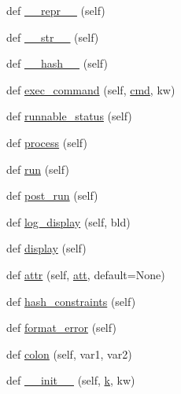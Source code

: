 \begin{DoxyCompactItemize}
\item 
def \hyperlink{classwaflib_1_1_task_1_1_task_base_a004a67fbb5d7e36d1a6ba48390e0d5f7}{\+\_\+\+\_\+repr\+\_\+\+\_\+} (self)
\item 
def \hyperlink{classwaflib_1_1_task_1_1_task_base_a07123f80c95b1d17a699064cd10d8885}{\+\_\+\+\_\+str\+\_\+\+\_\+} (self)
\item 
def \hyperlink{classwaflib_1_1_task_1_1_task_base_a5e02f89716bcd37b2490adc0861c4bdd}{\+\_\+\+\_\+hash\+\_\+\+\_\+} (self)
\item 
def \hyperlink{classwaflib_1_1_task_1_1_task_base_a6326ff82d67a2b629c8d78b95cb8fec6}{exec\+\_\+command} (self, \hyperlink{sndfile__play_8m_adfc5ba7e22f5e4a6221c12a70503bef3}{cmd}, kw)
\item 
def \hyperlink{classwaflib_1_1_task_1_1_task_base_a10c4597d9085bd1680f9b3eb28e23899}{runnable\+\_\+status} (self)
\item 
def \hyperlink{classwaflib_1_1_task_1_1_task_base_ae5e951a187c8d09c31960bbcf76fad25}{process} (self)
\item 
def \hyperlink{classwaflib_1_1_task_1_1_task_base_ae549bc1a80fd94cc94fd1e764c76895c}{run} (self)
\item 
def \hyperlink{classwaflib_1_1_task_1_1_task_base_a21b09d3f18df76e1d8b0719f321ea3bd}{post\+\_\+run} (self)
\item 
def \hyperlink{classwaflib_1_1_task_1_1_task_base_adf380fd031fc987f4dcd54e1f70420a7}{log\+\_\+display} (self, bld)
\item 
def \hyperlink{classwaflib_1_1_task_1_1_task_base_a838316cf55ac50fab2ae0e8771917e74}{display} (self)
\item 
def \hyperlink{classwaflib_1_1_task_1_1_task_base_a8ead2ec09545f4e9e27d6b40f9f80eaa}{attr} (self, \hyperlink{filters_8h_a6cbe32dd86cefd1a8b182b3ee652e9bf}{att}, default=None)
\item 
def \hyperlink{classwaflib_1_1_task_1_1_task_base_ad4f2583a59ff62565735490154826033}{hash\+\_\+constraints} (self)
\item 
def \hyperlink{classwaflib_1_1_task_1_1_task_base_a321e667402035aa56626ee6f7b3b8223}{format\+\_\+error} (self)
\item 
def \hyperlink{classwaflib_1_1_task_1_1_task_base_ae9648ec691e059291a79f38ef6ee12cc}{colon} (self, var1, var2)
\item 
def \hyperlink{classwaflib_1_1_task_1_1_task_base_add6ae927b00bd1f14d5b87738dd53e70}{\+\_\+\+\_\+init\+\_\+\+\_\+} (self, \hyperlink{rfft2d_test_m_l_8m_adc468c70fb574ebd07287b38d0d0676d}{k}, kw)
\item 

\end{DoxyCompactItemize}
